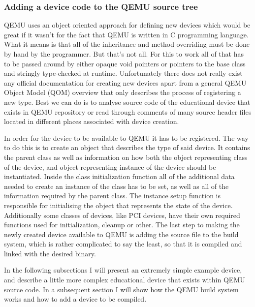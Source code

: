 \subsubsection{Adding a device code to the QEMU source tree}

QEMU uses an object oriented approach for defining new devices which would be
great if it wasn't for the fact that QEMU is written in C programming language.
What it means is that all of the inheritance and method overriding must be done
by hand by the programmer. But that's not all. For this to work all of that has
to be passed around by either opaque void pointers or pointers to the base
class and stringly type-checked at runtime. Unfortunately there does not really
exist any official documentation for creating new devices apart from a general
QEMU Object Model (QOM) overview that only describes the process of registering
a new type. Best we can do is to analyse source code of the educational device
that exists in QEMU repository or read through comments of many source header
files located in different places associated with device creation.

In order for the device to be available to QEMU it has to be registered. The
way to do this is to create an object that describes the type of said device.
It contains the parent class as well as information on how both the object
representing class of the device, and object representing instance of the
device should be instantiated. Inside the class initialization function all of
the additional data needed to create an instance of the class has to be set, as
well as all of the information required by the parent class. The instance setup
function is responsible for initialising the object that represents the state
of the device. Additionally some classes of devices, like PCI devices, have
their own required functions used for initialization, cleanup or other. The
last step to making the newly created device available to QEMU is adding the
source file to the build system, which is rather complicated to say the least,
so that it is compiled and linked with the desired binary.

In the following subsections I will present an extremely simple example device,
and describe a little more complex educational device that exists within QEMU
source code. In a subsequent section I will show how the QEMU build system
works and how to add a device to be compiled.


